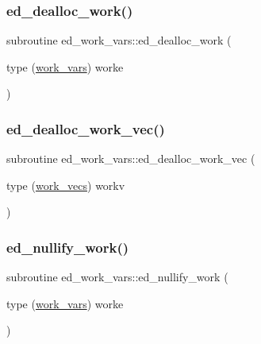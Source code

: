 \mbox{\label{namespaceed__work__vars_afa61eb802d72e14002f44379afceea9d}} 
\subsubsection{\texorpdfstring{ed\+\_\+dealloc\+\_\+work()}{ed\_dealloc\_work()}}
{\footnotesize\ttfamily subroutine ed\+\_\+work\+\_\+vars\+::ed\+\_\+dealloc\+\_\+work (\begin{DoxyParamCaption}\item[{type (\hyperlink{structed__work__vars_1_1work__vars}{work\+\_\+vars})}]{worke }\end{DoxyParamCaption})}

\mbox{\label{namespaceed__work__vars_a61bfa6695e1a8ac94e02b917a83aabea}} 
\subsubsection{\texorpdfstring{ed\+\_\+dealloc\+\_\+work\+\_\+vec()}{ed\_dealloc\_work\_vec()}}
{\footnotesize\ttfamily subroutine ed\+\_\+work\+\_\+vars\+::ed\+\_\+dealloc\+\_\+work\+\_\+vec (\begin{DoxyParamCaption}\item[{type (\hyperlink{structed__work__vars_1_1work__vecs}{work\+\_\+vecs})}]{workv }\end{DoxyParamCaption})}

\mbox{\label{namespaceed__work__vars_aa1df64125c17b7fc7f50eda82c32e805}} 
\subsubsection{\texorpdfstring{ed\+\_\+nullify\+\_\+work()}{ed\_nullify\_work()}}
{\footnotesize\ttfamily subroutine ed\+\_\+work\+\_\+vars\+::ed\+\_\+nullify\+\_\+work (\begin{DoxyParamCaption}\item[{type (\hyperlink{structed__work__vars_1_1work__vars}{work\+\_\+vars})}]{worke }\end{DoxyParamCaption})}

